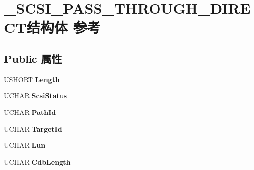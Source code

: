 \hypertarget{struct___s_c_s_i___p_a_s_s___t_h_r_o_u_g_h___d_i_r_e_c_t}{}\section{\+\_\+\+S\+C\+S\+I\+\_\+\+P\+A\+S\+S\+\_\+\+T\+H\+R\+O\+U\+G\+H\+\_\+\+D\+I\+R\+E\+C\+T结构体 参考}
\label{struct___s_c_s_i___p_a_s_s___t_h_r_o_u_g_h___d_i_r_e_c_t}
\subsection*{Public 属性}
\begin{DoxyCompactItemize}
\item 
\mbox{\label{struct___s_c_s_i___p_a_s_s___t_h_r_o_u_g_h___d_i_r_e_c_t_a4fbb3b811b6697e95db677b52f315fad}} 
U\+S\+H\+O\+RT {\bfseries Length}
\item 
\mbox{\label{struct___s_c_s_i___p_a_s_s___t_h_r_o_u_g_h___d_i_r_e_c_t_ab307d01da434164ded5702726d6fcee2}} 
U\+C\+H\+AR {\bfseries Scsi\+Status}
\item 
\mbox{\label{struct___s_c_s_i___p_a_s_s___t_h_r_o_u_g_h___d_i_r_e_c_t_a16101c55ab79b679813e39ff0caec4b0}} 
U\+C\+H\+AR {\bfseries Path\+Id}
\item 
\mbox{\label{struct___s_c_s_i___p_a_s_s___t_h_r_o_u_g_h___d_i_r_e_c_t_aac4de6871fc4f4d8f8232b815fa9f5b8}} 
U\+C\+H\+AR {\bfseries Target\+Id}
\item 
\mbox{\label{struct___s_c_s_i___p_a_s_s___t_h_r_o_u_g_h___d_i_r_e_c_t_a31b7a035a97e8b97a34a7fd3cd9b4035}} 
U\+C\+H\+AR {\bfseries Lun}
\item 
\mbox{\label{struct___s_c_s_i___p_a_s_s___t_h_r_o_u_g_h___d_i_r_e_c_t_a07358696283c36ccba04c096713ce4e2}} 
U\+C\+H\+AR {\bfseries Cdb\+Length}
\item 

\end{DoxyCompactItemize}
